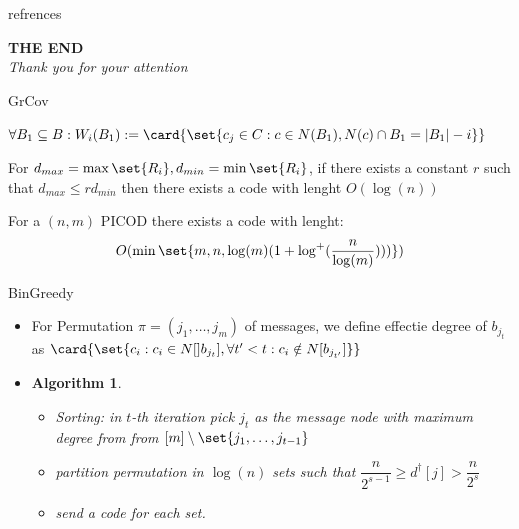 \documentclass[xcolor=dvipsnames, aspectratio=169]{beamer}
\newtheorem{algg}[theorem]{Algorithm}
\begin{document}
\begin{frame}{refrences}
	\printbibliography
	
\end{frame}
\begin{frame}
    \centering
    \vspace{1cm}
    \hspace{2cm}  \textbf{\Huge{THE END}} \\
    \vspace{0.5cm}
    \textit{\Large{Thank you for your attention}}
\end{frame}


\begin{frame}{GrCov}
	\begin{definition}
		$\forall B_1 \subseteq B: W_i(B_1) := \card{\set{c_j \in C: c \in N(B_1), N(c) \cap B_1 = |B_1| - i }}$
	\end{definition}
	\begin{lemma}
		For $d_{max} = \max\set{R_i}, d_{min} = \min\set{R_i}$, if there exists a constant $r$ such that $d_{max} \leq r d_{min}$ then there exists a code with lenght $O(\log(n))$
	\end{lemma}
	\begin{theorem}
		For a $(n, m)$ PICOD there exists a code with lenght:
			$$O(\min\set{m, n, \log(m)(1 + \log^{+}(\dfrac{n}{\log(m)}) ))})$$
	\end{theorem}
\end{frame}
\begin{frame}{BinGreedy}
			\begin{itemize}
				\item<1->[]
	\begin{definition}
		For Permutation $\pi = (j_1, \ldots, j_m)$ of messages, we define effectie degree of $b_{j_t}$ as $\card{\set{c_i: c_i \in N[]b_{j_t}], \forall t' < t: c_i \notin N[b_{j_{t'}}]}}$
	\end{definition}
	\item<2->[]
	\begin{algg}
		\begin{itemize}
			\item<2-> Sorting: in $t$-th iteration pick $j_t$ as the message node with maximum degree from from $[m] \setminus \set{j_1, \ldots, j_{t - 1}}$
			\item<3-> partition permutation in $\log(n)$ sets such that $\dfrac{n}{2^{s - 1}} \geq d^\dagger[j] > \dfrac{n}{2^s}$
			\item<4-> send a code for each set.
		\end{itemize}
	\end{algg}
			\end{itemize}
\end{frame}
\end{document}
